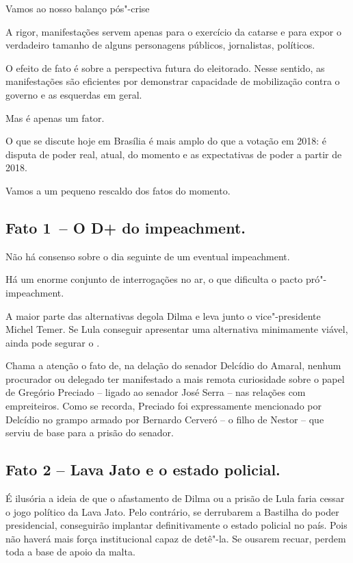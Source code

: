  

Vamos ao nosso balanço pós"-crise

A rigor, manifestações servem apenas para o exercício da catarse e para
expor o verdadeiro tamanho de alguns personagens públicos, jornalistas,
políticos.

O efeito de fato é sobre a perspectiva futura do eleitorado. Nesse
sentido, as manifestações são eficientes por demonstrar capacidade de
mobilização contra o governo e as esquerdas em geral.

Mas é apenas um fator.

O que se discute hoje em Brasília é mais amplo do que a votação em 2018:
é disputa de poder real, atual, do momento e as expectativas de poder a
partir de 2018.

Vamos a um pequeno rescaldo dos fatos do momento.

\subsection{\textbf{Fato 1}~-- O D+ do impeachment.}

Não há consenso sobre o dia seguinte de um eventual impeachment.

Há um enorme conjunto de interrogações no ar, o que dificulta o pacto
pró"-impeachment.

A maior parte das alternativas degola Dilma e leva junto o
vice"-presidente Michel Temer. Se Lula conseguir apresentar uma
alternativa minimamente viável, ainda pode segurar o .

Chama a atenção o fato de, na delação do senador Delcídio do Amaral,
nenhum procurador ou delegado ter manifestado a mais remota curiosidade
sobre o papel de Gregório Preciado -- ligado ao senador José Serra --
nas relações com empreiteiros. Como se recorda, Preciado foi
expressamente mencionado por Delcídio no grampo armado por Bernardo
Cerveró -- o filho de Nestor -- que serviu de base para a prisão do
senador.

\subsection{\textbf{Fa}to 2 -- Lava Jato e o estado policial.}

É ilusória a ideia de que o afastamento de Dilma ou a prisão de Lula
faria cessar o jogo político da Lava Jato. Pelo contrário, se derrubarem
a Bastilha do poder presidencial, conseguirão implantar definitivamente
o estado policial no país. Pois não haverá mais força institucional
capaz de detê"-la. Se ousarem recuar, perdem toda a base de apoio da
malta.


